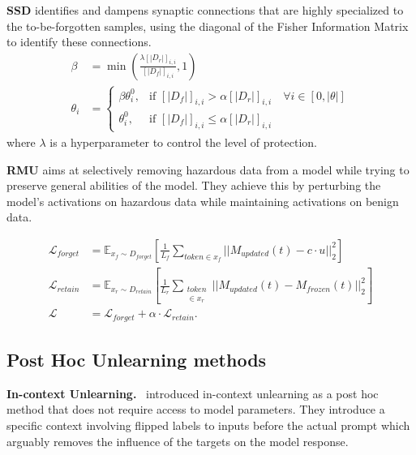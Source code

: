 \textbf{SSD} \citet{foster2023fastmachineunlearningretraining} identifies and dampens synaptic connections that are highly specialized to the to-be-forgotten samples, using the diagonal of the Fisher Information Matrix to identify these connections. 
\begin{align*}
    \beta &= \min \left( \frac{\lambda \left[ \left| D_r \right| \right]_{i,i}}{\left[ \left| D_f \right| \right]_{i,i}}, 1 \right) \\
    \theta_i &= 
    \begin{cases}
        \beta \theta_i^0, & \text{if } \left[ \left| D_f \right| \right]_{i,i} > \alpha \left[ \left| D_r \right| \right]_{i,i} \quad \forall i \in [0, |\theta|] \\
        \theta_i^0, & \text{if } \left[ \left| D_f \right| \right]_{i,i} \leq \alpha \left[ \left| D_r \right| \right]_{i,i} 
    \end{cases}
\end{align*}
where $\lambda$ is a hyperparameter to control the level of protection.

\textbf{RMU} \citet{li2024wmdpbenchmarkmeasuringreducing} aims at selectively removing hazardous data from a model while trying to preserve general abilities of the model. They achieve this by perturbing the model's activations on hazardous data while maintaining activations on benign data.

\begin{align*}    
\mathcal{L}_{forget} &= \mathbb{E}_{x_f \sim D_{forget}} \left[ \frac{1}{L_f} \sum_{token \in x_f} ||M_{updated}(t) - c \cdot u||_2^2 \right]\\
\mathcal{L}_{retain} &= \mathbb{E}_{x_r \sim D_{retain}} \left[ \frac{1}{L_r} \sum_{\substack{token \\ \in x_r}} ||M_{updated}(t) - M_{frozen}(t)||_2^2 \right]\\
\mathcal{L} &= \mathcal{L}_{forget} + \alpha \cdot \mathcal{L}_{retain}.
\end{align*} 

\subsection{Post Hoc Unlearning methods}
\textbf{In-context Unlearning.}~\citet{pawelczyk2023context} introduced in-context unlearning as a post hoc method that does not require access to model parameters. They introduce a specific context involving flipped labels to inputs before the actual prompt which arguably removes the influence of the targets on the model response.

